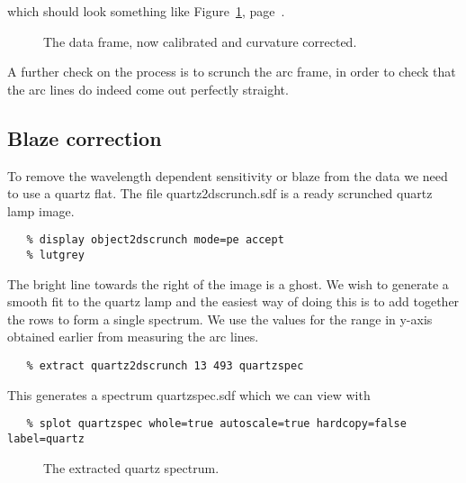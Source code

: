 \documentclass[twoside,11pt]{article}
\newcommand{\scspec}[2]{#1}
\newcommand{\scspec}[2]{#2}
\begin{document}
which should look something like \scspec{Figure~\ref{scrunched},
page~\pageref{scrunched}.}{the figure below.}

\begin{figure}
\begin{center}
  \scspec{\leavevmode\epsfysize=105mm\epsfbox{sc7_19.eps}}
         {\leavevmode\epsfysize=136mm}

  \parbox{140mm}{
    \caption{The data frame, now calibrated and curvature corrected.}
    \label{scrunched}
  }
\end{center}
\end{figure}


A further check on the process is to scrunch the arc frame, in order
to check that the arc lines do indeed come out perfectly straight.


\subsection{Blaze correction}

To remove the wavelength dependent sensitivity or blaze from the data
we need to use a quartz flat. The file quartz2dscrunch.sdf is a ready
scrunched quartz lamp image.

{\scspec{\small}{ }
\begin{verbatim}
   % display object2dscrunch mode=pe accept
   % lutgrey
\end{verbatim}
}

The bright line towards the right of the image is a ghost. We wish to
generate a smooth fit to the quartz lamp and the easiest way of doing
this is to add together the rows to form a single spectrum. We use the
values for the range in y-axis obtained earlier from measuring the arc
lines.

{\scspec{\small}{ }
\begin{verbatim}
   % extract quartz2dscrunch 13 493 quartzspec
\end{verbatim}
}

This generates a spectrum quartzspec.sdf which we can view with

{\scspec{\small}{ }
\begin{verbatim}
   % splot quartzspec whole=true autoscale=true hardcopy=false label=quartz
\end{verbatim}
}

\begin{figure}
\begin{center}
  \scspec{\leavevmode\epsfysize=105mm\epsfbox{sc7_20.eps}}
          {\leavevmode\epsfysize=136mm}

  \parbox{140mm}{
    \caption{The extracted quartz spectrum.}
    \label{quartzfit}
  }
\end{center}
\end{figure}
\end{document}
